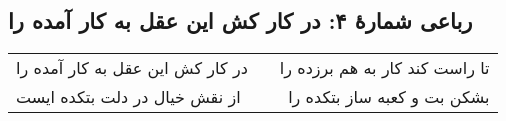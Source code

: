 \begin{center}
\section*{رباعی شمارهٔ ۴: در کار کش این عقل به کار آمده را}
\label{sec:004}
\begin{longtable}{l p{0.5cm} r}
در کار کش این عقل به کار آمده را
&&
تا راست کند کار به هم برزده را 
\\
از نقش خیال در دلت بتکده ایست
&&
بشکن بت و کعبه ساز بتکده را
\\
\end{longtable}
\end{center}
